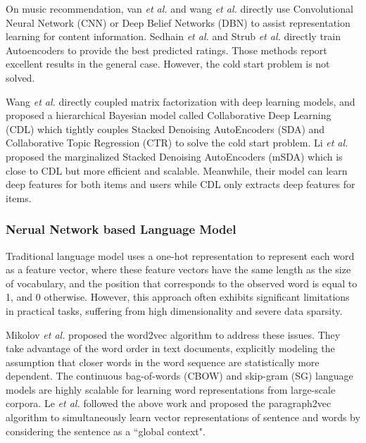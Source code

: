 \documentclass{sig-alternate-05-2015}
\begin{document}
On music recommendation, van \textit{et al.} \cite{van2013deep}
and wang \textit{et al.} \cite{wang2014improving}
directly use Convolutional Neural Network (CNN)
or Deep Belief Networks (DBN)
to assist representation learning for content information.
Sedhain \textit{et al.} \cite{sedhain2015autorec} and
Strub \textit{et al.} \cite{strub2015collaborative}
directly train Autoencoders to provide the best predicted ratings.
Those methods report excellent results in the general case.
However, the cold start problem is not solved.

Wang \textit{et al.} \cite{wang2015collaborative} 
directly coupled matrix factorization with deep learning models,
and proposed a hierarchical Bayesian model called
Collaborative Deep Learning (CDL)
which tightly couples Stacked Denoising AutoEncoders (SDA) and
Collaborative Topic Regression (CTR) to
solve the cold start problem.
Li \textit{et al.} \cite{li2015deep} proposed the
marginalized Stacked Denoising AutoEncoders (mSDA) which
is close to CDL but more efficient and scalable.
Meanwhile, their model can learn deep features for both items and users
while CDL only extracts deep features for items.

\subsubsection{Nerual Network based Language Model}
Traditional language model uses a one-hot representation
to represent each word as a feature vector,
where these feature vectors have the same length
as the size of vocabulary, and the position that
corresponds to the observed word is equal to 1, and 0 otherwise.
However, this approach often exhibits significant limitations in practical tasks,
suffering from high dimensionality and severe data sparsity.

Mikolov \textit{et al.} \cite{mikolov2013efficient, mikolov2013distributed}
proposed the word2vec algorithm to address these issues.
They take advantage of the word order in text documents,
explicitly modeling the assumption that closer words
in the word sequence are statistically more dependent.
The continuous bag-of-words (CBOW) and skip-gram (SG)
language models are highly scalable for learning word
representations from large-scale corpora.
Le \textit{et al.} \cite{le2014distributed} followed the above
work and proposed the paragraph2vec algorithm to simultaneously
learn vector representations of sentence and words
by considering the sentence as a ``global context".
\end{document}
